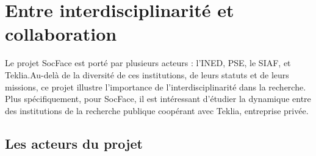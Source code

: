 \chapter{Entre interdisciplinarité et collaboration}
Le projet SocFace est porté par plusieurs acteurs : l'\gls{INED}, PSE, le SIAF, et Teklia.Au-delà de la diversité de ces institutions, de leurs statuts et de leurs missions, ce projet illustre l’importance de l’interdisciplinarité dans la recherche. Plus spécifiquement, pour SocFace, il est intéressant d’étudier la dynamique entre des institutions de la recherche publique coopérant avec Teklia, entreprise privée. 

    \section{Les acteurs du projet}

